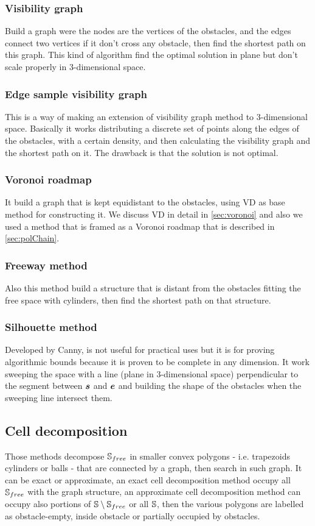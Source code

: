 \documentclass[dissertation.tex]{subfiles}
\begin{document}
\subsubsection{Visibility graph}
Build a graph were the nodes are the vertices of the obstacles, and
the edges connect two vertices if it don't cross any obstacle, then
find the shortest path on this graph. This
kind of algorithm find the optimal solution in plane but don't scale
properly in 3-dimensional space.

\subsubsection{Edge sample visibility graph}
This is a way of making an extension of visibility graph method to
3-dimensional space. Basically it works distributing a discrete set of points
along the edges of the obstacles, with a certain density, and then
calculating the visibility
graph and the shortest path on it. The drawback is that the solution
is not optimal.

\subsubsection{Voronoi roadmap}
It build a graph that is kept equidistant to the obstacles, using
\ac{VD} as base method for constructing it. We discuss \ac{VD}
in detail in \cref{sec:voronoi} and also we used a method that is
framed as a Voronoi roadmap that is described in \cref{sec:polChain}.

\subsubsection{Freeway method}
Also this method build a structure that is distant from the obstacles
fitting the free space with cylinders, then find the shortest path on
that structure.

\subsubsection{Silhouette method}
Developed by Canny, is not useful for practical uses but it is for
proving algorithmic bounds because it is proven to be complete in any
dimension. It work sweeping the space with a line (plane in
3-dimensional space) perpendicular to the
segment between $\boldsymbol{s}$ and $\boldsymbol{e}$ and building the shape of the
obstacles when the sweeping line intersect them.

\subsection{Cell decomposition}
Those methods decompose $\mathbb{S}_{free}$ in smaller convex polygons - i.e.
trapezoids cylinders or balls - that
are connected by a graph, then search in such graph. It can be exact
or approximate, an exact cell decomposition method occupy all
$\mathbb{S}_{free}$ with the graph structure, an approximate cell
decomposition method can occupy also portions of
$\mathbb{S}\setminus\mathbb{S}_{free}$ or all $\mathbb{S}$, then the various polygons are
labelled as obstacle-empty, inside obstacle or partially occupied by
obstacles.
\end{document}
